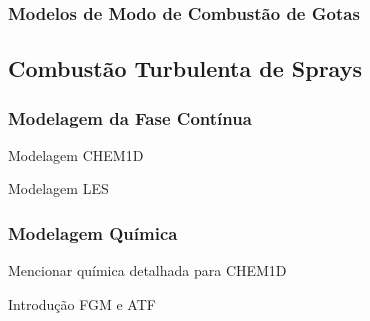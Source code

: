 

\subsubsection{Modelos de Modo de Combustão de Gotas}




\subsection{Combustão Turbulenta de Sprays}

\subsubsection{Modelagem da Fase Contínua}

Modelagem CHEM1D

Modelagem LES

\subsubsection{Modelagem Química}

Mencionar química detalhada para CHEM1D

Introdução FGM e ATF